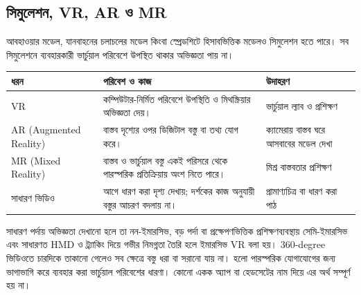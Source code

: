 \begin{topicbody}
\subsection{সিমুলেশন, VR, AR ও MR}
আবহাওয়ার মডেল, যানবাহনের চলাচলের মডেল কিংবা স্প্রেডশিটে হিসাবভিত্তিক মডেলও সিমুলেশন হতে পারে। সব সিমুলেশনে ব্যবহারকারী ভার্চুয়াল পরিবেশে উপস্থিত থাকার অভিজ্ঞতা পায় না।
\begin{compacttable}
\begin{tabular}{|p{}|p{}|p{}|}
\hline\textbf{ধরন} & \textbf{পরিবেশ ও কাজ} & \textbf{উদাহরণ}\\\hline
VR & কম্পিউটার-নির্মিত পরিবেশে উপস্থিতি ও মিথস্ক্রিয়ার অভিজ্ঞতা দেয়। & ভার্চুয়াল ল্যাব ও প্রশিক্ষণ\\\hline
AR (Augmented Reality) & বাস্তব দৃশ্যের ওপর ডিজিটাল বস্তু বা তথ্য যোগ করে। & ক্যামেরায় বাস্তব ঘরে আসবাবের মডেল দেখা\\\hline
MR (Mixed Reality) & বাস্তব ও ভার্চুয়াল বস্তু একই পরিসরে থেকে পারস্পরিক প্রতিক্রিয়ায় অংশ নিতে পারে। & মিশ্র বাস্তবতার প্রশিক্ষণ\\\hline
সাধারণ ভিডিও & আগে ধারণ করা দৃশ্য দেখায়; দর্শকের কাজ অনুযায়ী বস্তুর আচরণ বদলায় না। & প্রামাণ্যচিত্র বা ধারণ করা পাঠ\\\hline
\end{tabular}
\end{compacttable}
সাধারণ পর্দায় অভিজ্ঞতা দেখানো হলে তা নন-ইমারসিভ, বড় পর্দা বা প্রক্ষেপণভিত্তিক প্রশিক্ষণব্যবস্থায় সেমি-ইমারসিভ এবং সাধারণত HMD ও ট্র্যাকিং দিয়ে গভীর নিমগ্নতা তৈরি হলে ইমারসিভ VR বলা হয়। 360-degree ভিডিওতে চারদিকে তাকানো গেলেও সব ক্ষেত্রে বস্তু ধরা বা সরানো যায় না।
 হলো পারস্পরিক যোগাযোগের জন্য ভাগাভাগি করে ব্যবহার করা ভার্চুয়াল পরিবেশের ধারণা। কোনো একক অ্যাপ বা হেডসেটের নাম দিয়ে এর অর্থ সম্পূর্ণ হয় না।

\end{topicbody}
